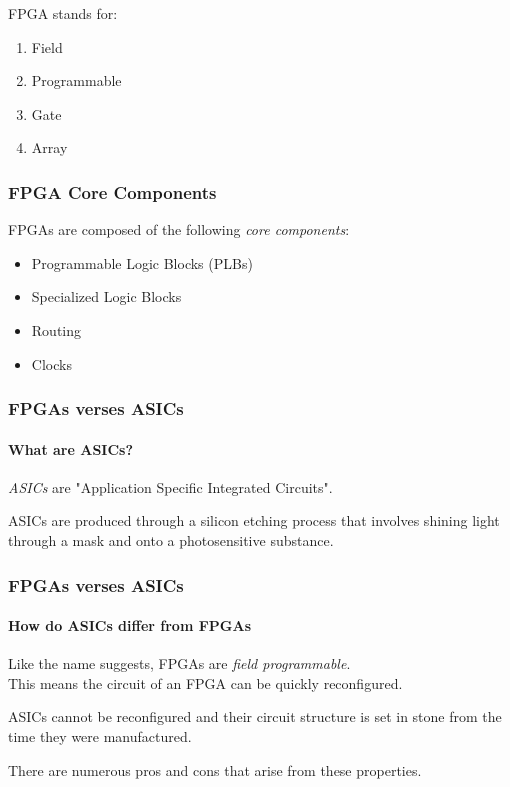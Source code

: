 \documentclass{beamer}
\begin{document}
\begin{frame}
\begin{multicols}{2}
    \AlegreyaExtraBold FPGA \ttfamily stands for:
    \begin{enumerate}
      \item Field
      \item Programmable
      \item Gate
      \item Array
    \end{enumerate}
    
    \vspace*{\fill}

    \end{multicols}
    
  \end{frame}
  
  \begin{frame}
    \frametitle{FPGA Core Components}
    FPGAs are composed of the following \textit{core components}:
    \begin{itemize}
      \item Programmable Logic Blocks (PLBs)
      \item Specialized Logic Blocks
      \item Routing
      \item Clocks
    \end{itemize}
  \end{frame}
  
  \begin{frame}
    \frametitle{FPGAs verses ASICs}
    \framesubtitle{What are ASICs?}

    \textit{ASICs} are "Application Specific Integrated Circuits".

    \vfill

    ASICs are produced through a silicon etching process that
    involves shining light through a mask and onto a photosensitive substance.

  \end{frame}
  
  \begin{frame}
    \frametitle{FPGAs verses ASICs}
    \framesubtitle{How do ASICs differ from FPGAs}

    Like the name suggests, FPGAs are \textit{field programmable}. \\
    This means the circuit of an FPGA can be quickly reconfigured.

    \vfill

    ASICs cannot be reconfigured and their circuit structure
    is set in stone from the time they were manufactured.

    \vfill

    There are numerous pros and cons that arise from these properties.

  \end{frame}
\end{document}
